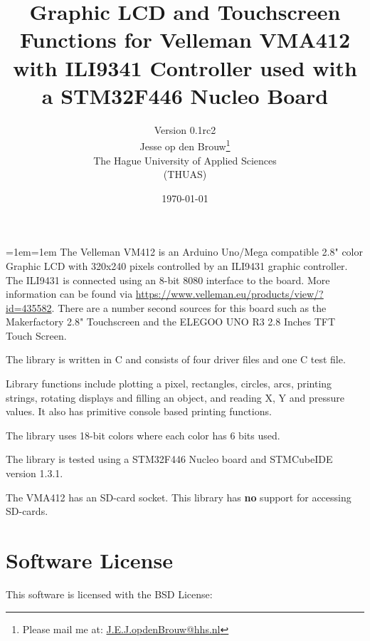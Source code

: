 \documentclass[12pt]{article}
\author{Version 0.1rc2\\[2ex]Jesse op den Brouw\thanks{Please mail me at: \href{mailto:J.E.J.opdenBrouw@hhs.nl}{J.E.J.opdenBrouw@hhs.nl}}\\The Hague University of Applied Sciences\\(THUAS)}
\title{Graphic LCD and Touchscreen Functions for Velleman VMA412 with ILI9341 Controller used with a STM32F446 Nucleo Board}
\date{\today}
\begin{document}
\raggedbottom
\maketitle

\vfill
{\small\leftskip=1em\rightskip=1em
The Velleman VM412 is an Arduino Uno/Mega compatible 2.8" color Graphic LCD with 320x240 pixels controlled by an ILI9431 graphic controller. The ILI9431 is connected using an 8-bit 8080 interface to the board. More information can be found via \url{https://www.velleman.eu/products/view/?id=435582}. There are a number second sources for this board such as the Makerfactory 2.8" Touchscreen and the ELEGOO UNO R3 2.8 Inches TFT Touch Screen.

The library is written in C and consists of four driver files and one C test file.

Library functions include plotting a pixel, rectangles, circles, arcs, printing strings, rotating displays and filling an object, and reading X, Y and pressure values. It also has primitive console based printing functions.

The library uses 18-bit colors where each color has 6 bits used.

The library is tested using a STM32F446 Nucleo board and STMCubeIDE version 1.3.1.

The VMA412 has an SD-card socket. This library has \textbf{no} support for accessing SD-cards.

}
\vfill

\newpage

\tableofcontents


\newpage

\section{Software License}
This software is licensed with the BSD License:
\end{document}
